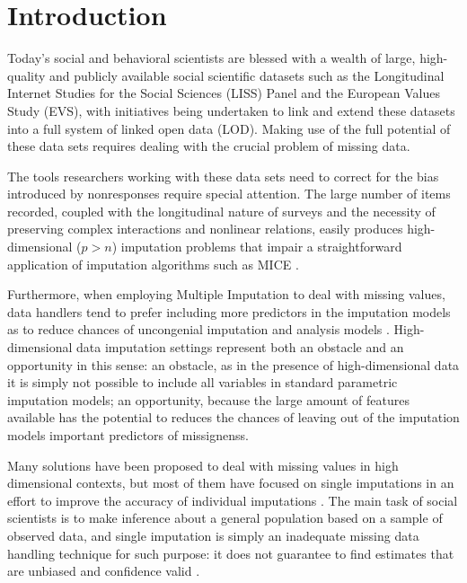 \maketitle
\section{Introduction}

Today’s social and behavioral scientists are blessed with a wealth of large, high-quality and publicly available social scientific datasets such as the Longitudinal Internet Studies for the Social Sciences (LISS) Panel and the European Values Study (EVS), with initiatives being undertaken to link and extend these datasets into a full system of linked open data (LOD). Making use of the full potential of these data sets requires dealing with the crucial problem of missing data. 

The tools researchers working with these data sets need to correct for the bias introduced by nonresponses 
require special attention. The large number of items recorded, coupled with the longitudinal nature of surveys and the necessity
of preserving complex interactions and nonlinear relations, easily produces high-dimensional ($p>n$) imputation 
problems that impair a straightforward application of imputation algorithms such as MICE \citep{vanBuuren:2012}.

Furthermore, when employing Multiple Imputation to deal with missing values, data handlers tend to prefer including more
predictors in the imputation models as to reduce chances of uncongenial imputation and analysis models \citep{meng:1994}.
High-dimensional data imputation settings represent both an obstacle and an opportunity in this sense: an 
obstacle, as in the presence of high-dimensional data it is simply not possible to include all variables in standard parametric
imputation models; an opportunity, because the large amount of features available has the potential to reduces the chances of 
leaving out of the imputation models important predictors of missignenss.

Many solutions have been proposed to deal with missing values in high dimensional contexts, but most of them
have focused on single imputations in an effort to improve the accuracy of individual imputations \citep{kimEtAl:2005, 
stekhovenBuhlmann:2011, d'ambrosioEtAl:2012}.
The main task of social scientists is to make inference about a general population based on a sample of observed 
data, and single imputation is simply an inadequate missing data handling technique for such purpose: it 
does not guarantee to find estimates that are unbiased and confidence valid \citep{rubin:1996}.

